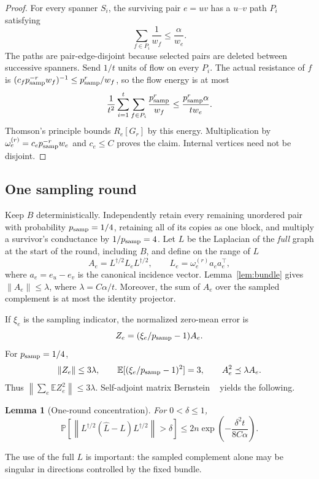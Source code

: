 \documentclass[11pt]{article}
\newtheorem{lemma}[theorem]{Lemma}
\theoremstyle{definition}
\newcommand{\E}{\mathbb{E}}
\newcommand{\Prb}{\mathbb{P}}
\newcommand{\norm}[1]{\left\lVert #1\right\rVert}
\begin{document}
\begin{proof}
For every spanner $S_i$, the surviving pair $e=uv$ has a $u$--$v$ path
$P_i$ satisfying
\[
        \sum_{f\in P_i}\frac1{w_f}\le\frac{\alpha}{w_e}.
\]
The paths are pair-edge-disjoint because selected pairs are deleted between
successive spanners.  Send $1/t$ units of flow on every $P_i$.  The actual
resistance of $f$ is
$(c_fp_{\rm samp}^{-r}w_f)^{-1}\le p_{\rm samp}^r/w_f$, so the flow energy is at most
\[
 \frac1{t^2}\sum_{i=1}^t\sum_{f\in P_i}\frac{p_{\rm samp}^r}{w_f}
 \le \frac{p_{\rm samp}^r\alpha}{tw_e}.
\]
Thomson's principle bounds $R_e[G_r]$ by this energy.  Multiplication by
$\omega_e^{(r)}=c_ep_{\rm samp}^{-r}w_e$ and $c_e\le C$ proves the claim.  Internal vertices need
not be disjoint.
\end{proof}

\subsection{One sampling round}

Keep $B$ deterministically.  Independently retain every remaining unordered
pair with probability $p_{\rm samp}=1/4$, retaining all of its copies as one
block, and multiply a survivor's conductance by $1/p_{\rm samp}=4$.  Let $L$ be the Laplacian of the
\emph{full} graph at the start of the round, including $B$, and define on the
range of $L$
\[
 A_e=L^{\dagger/2}L_eL^{\dagger/2},
 \qquad L_e=\omega_e^{(r)}a_ea_e^\top,
\]
where $a_e=e_u-e_v$ is the canonical incidence vector.
Lemma~\ref{lem:bundle} gives $\norm{A_e}\le\lambda$, where
$\lambda=C\alpha/t$.  Moreover, the sum of $A_e$ over the sampled complement
is at most the identity projector.

If $\xi_e$ is the sampling indicator, the normalized zero-mean error is
\[
        Z_e=(\xi_e/p_{\rm samp}-1)A_e.
\]
For $p_{\rm samp}=1/4$,
\[
 \norm{Z_e}\le3\lambda,
 \qquad
 \E[(\xi_e/p_{\rm samp}-1)^2]=3,
 \qquad
 A_e^2\preceq\lambda A_e.
\]
Thus $\norm{\sum_e\E Z_e^2}\le3\lambda$.  Self-adjoint matrix Bernstein
~\cite{Tropp2012} yields the following.

\begin{lemma}[One-round concentration]\label{lem:one-round}
For $0<\delta\le1$,
\[
 \Prb\!\left[
  \norm{L^{\dagger/2}(\widehat L-L)L^{\dagger/2}}>\delta
 \right]
 \le 2n\exp\!\left(-\frac{\delta^2t}{8C\alpha}\right).
\]
\end{lemma}

The use of the full $L$ is important: the sampled complement alone may be
singular in directions controlled by the fixed bundle.
\end{document}
